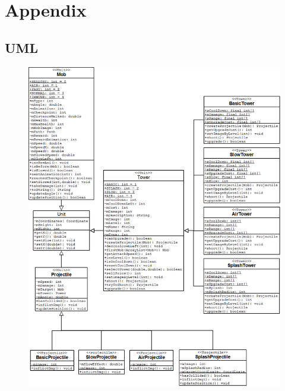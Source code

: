 \appendix
\chapter{Appendix}

\section{UML}

\begin{figure}[here]

\begin{center}

\includegraphics[scale=0.44]{pics/chapters/AppendixB/units_class_diagram}

\end{center}

\end{figure}